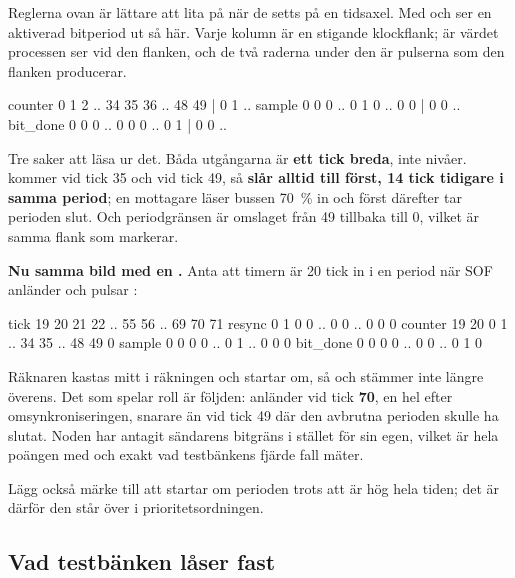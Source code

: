 Reglerna ovan är lättare att lita på när de setts på en tidsaxel. Med  och
 ser en aktiverad bitperiod ut så här. Varje kolumn är en stigande klockflank;
 är värdet processen ser vid den flanken, och de två raderna under den är pulserna som
den flanken producerar.

\begin{textdrawing}
counter      0   1   2  ..  34  35  36  ..  48  49   |   0   1  ..
sample       0   0   0  ..   0   1   0  ..   0   0   |   0   0  ..
bit_done     0   0   0  ..   0   0   0  ..   0   1   |   0   0  ..
\end{textdrawing}

Tre saker att läsa ur det. Båda utgångarna är \textbf{ett tick breda}, inte nivåer. 
kommer vid tick 35 och  vid tick 49, så \textbf{ slår alltid till först,
14 tick tidigare i samma period}; en mottagare läser bussen 70~\% in och först därefter tar perioden
slut. Och periodgränsen är omslaget från 49 tillbaka till 0, vilket är samma flank som
 markerar.

\textbf{Nu samma bild med en .} Anta att timern är 20 tick in i en period när SOF
anländer och  pulsar :

\begin{textdrawing}
tick        19  20  21  22  ..  55  56  ..  69  70  71
resync       0   1   0   0  ..   0   0  ..   0   0   0
counter     19  20   0   1  ..  34  35  ..  48  49   0
sample       0   0   0   0  ..   0   1  ..   0   0   0
bit_done     0   0   0   0  ..   0   0  ..   0   1   0
\end{textdrawing}

Räknaren kastas mitt i räkningen och startar om, så  och  stämmer inte
längre överens. Det som spelar roll är följden:  anländer vid tick \textbf{70}, en hel
 efter omsynkroniseringen, snarare än vid tick 49 där den avbrutna perioden
skulle ha slutat. Noden har antagit sändarens bitgräns i stället för sin egen, vilket är hela poängen
med  och exakt vad testbänkens fjärde fall mäter.

Lägg också märke till att  startar om perioden trots att  är hög hela
tiden; det är därför den står över  i prioritetsordningen.

\subsection{Vad testbänken låser fast}
\label{c12:sub:bttb}

